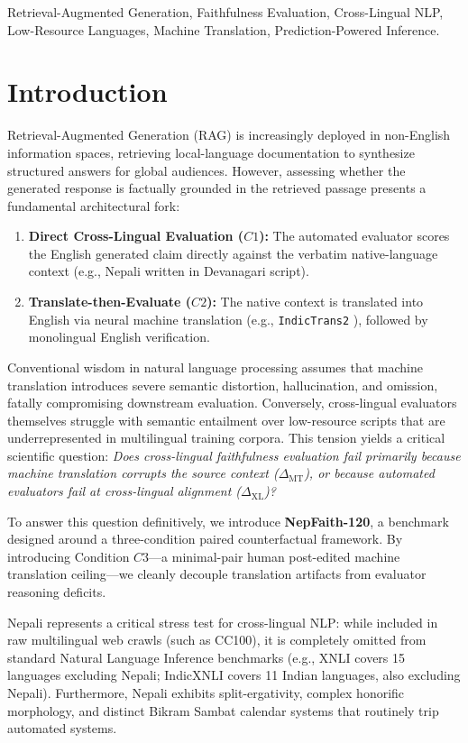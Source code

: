 \documentclass[conference]{IEEEtran}
\begin{document}
\begin{IEEEkeywords}
Retrieval-Augmented Generation, Faithfulness Evaluation, Cross-Lingual NLP, Low-Resource Languages, Machine Translation, Prediction-Powered Inference.
\end{IEEEkeywords}

\section{Introduction}
\label{sec:intro}
Retrieval-Augmented Generation (RAG) is increasingly deployed in non-English information spaces, retrieving local-language documentation to synthesize structured answers for global audiences. However, assessing whether the generated response is factually grounded in the retrieved passage presents a fundamental architectural fork:
\begin{enumerate}
    \item \textbf{Direct Cross-Lingual Evaluation ($C1$):} The automated evaluator scores the English generated claim directly against the verbatim native-language context (e.g., Nepali written in Devanagari script).
    \item \textbf{Translate-then-Evaluate ($C2$):} The native context is translated into English via neural machine translation (e.g., \texttt{IndicTrans2} \cite{gala2023indictrans2}), followed by monolingual English verification.
\end{enumerate}

Conventional wisdom in natural language processing assumes that machine translation introduces severe semantic distortion, hallucination, and omission, fatally compromising downstream evaluation. Conversely, cross-lingual evaluators themselves struggle with semantic entailment over low-resource scripts that are underrepresented in multilingual training corpora. This tension yields a critical scientific question: \textit{Does cross-lingual faithfulness evaluation fail primarily because machine translation corrupts the source context ($\Delta_{\text{MT}}$), or because automated evaluators fail at cross-lingual alignment ($\Delta_{\text{XL}}$)?}

To answer this question definitively, we introduce \textbf{NepFaith-120}, a benchmark designed around a three-condition paired counterfactual framework. By introducing Condition $C3$---a minimal-pair human post-edited machine translation ceiling---we cleanly decouple translation artifacts from evaluator reasoning deficits. 

Nepali represents a critical stress test for cross-lingual NLP: while included in raw multilingual web crawls (such as CC100), it is completely omitted from standard Natural Language Inference benchmarks (e.g., XNLI covers 15 languages excluding Nepali; IndicXNLI covers 11 Indian languages, also excluding Nepali). Furthermore, Nepali exhibits split-ergativity, complex honorific morphology, and distinct Bikram Sambat calendar systems that routinely trip automated systems.
\end{document}

